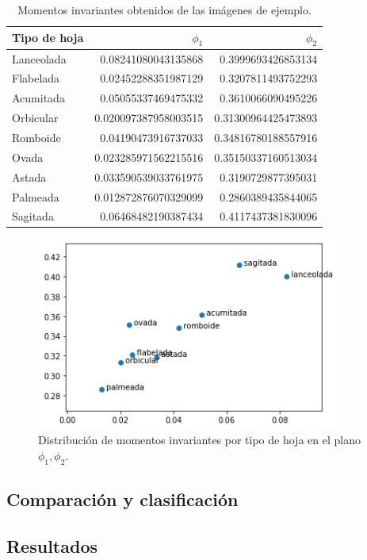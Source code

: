 \documentclass[letter]{article}
\begin{document}
\begin{table}[htbp]
\caption{Momentos invariantes obtenidos de las imágenes de ejemplo.}
\centering
\begin{tabular}{lrr}
\hline
Tipo de hoja & \(\phi_1\) & \(\phi_2\)\\
\hline
Lanceolada & 0.08241080043135868 & 0.3999693426853134\\
Flabelada & 0.02452288351987129 & 0.3207811493752293\\
Acumitada & 0.05055337469475332 & 0.3610066090495226\\
Orbicular & 0.020097387958003515 & 0.31300964425473893\\
Romboide & 0.04190473916737033 & 0.34816780188557916\\
Ovada & 0.023285971562215516 & 0.35150337160513034\\
Astada & 0.033590539033761975 & 0.3190729877395031\\
Palmeada & 0.012872876070329099 & 0.2860389435844065\\
Sagitada & 0.06468482190387434 & 0.4117437381830096\\
\hline
\end{tabular}
\end{table}

\begin{figure}[htbp]
\centering
\includegraphics[width=10cm]{./images/moments.jpg}
\caption{Distribución de momentos invariantes por tipo de hoja en el plano \(\phi_1, \phi_2\).}
\end{figure}

\subsection{Comparación y clasificación}
\label{sec:org224e27b}

\subsection{Resultados}
\label{sec:org3cddf3d}
\end{document}
